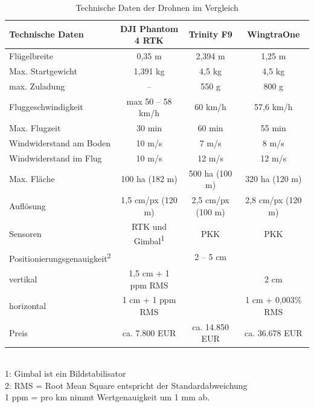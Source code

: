 \begin{table}[hbt]
\selectfont
\footnotesize
\begin{tabular}{lccc} %
\textbf{Technische Daten} & \textbf{DJI Phantom 4 RTK} & \textbf{Trinity F9}  & \textbf{WingtraOne} \\ %
\hline\hline
Flügelbreite & 0,35 m & 2,394 m & 1,25 m \\
Max. Startgewicht & 1,391 kg & 4,5 kg & 4,5 kg \\
max. Zuladung & – & 550 g & 800 g \\
Fluggeschwindigkeit & max 50 – 58 km/h & 60 km/h & 57,6 km/h \\
Max. Flugzeit & 30 min & 60 min & 55 min \\
Windwiderstand am Boden & 10 m/s & 7 m/s & 8 m/s \\
Windwiderstand im Flug & 10 m/s & 12 m/s & 12 m/s \\
Max. Fläche & 100 ha (182 m) & 500 ha (100 m) & 320 ha (120 m) \\
Auflösung & 1,5 cm/px (120 m) & 2,5 cm/px (100 m) & 2,8 cm/px (120 m) \\
Sensoren & RTK und Gimbal\textsuperscript{1} & PKK & PKK \\
Positionierungsgenauigkeit\textsuperscript{2} &  & 2 – 5 cm &  \\
{    } vertikal & 1,5 cm + 1 ppm RMS &  & 2 cm  \\
{    } horizontal & 1 cm + 1 ppm RMS &  & 1 cm + 0,003\% RMS\\
Preis & ca. 7.800 EUR & ca. 14.850 EUR & ca. 36.678 EUR\\
\hline
\end{tabular}
\\
\scriptsize
1: Gimbal ist ein Bildstabilisator \\
2: RMS = Root Mean Square entspricht der Standardabweichung \\
1 ppm = pro km nimmt Wertgenauigkeit um 1 mm ab. 
\caption{Technische Daten der Drohnen im Vergleich}
\label{tab:technischedaten}
\end{table}

